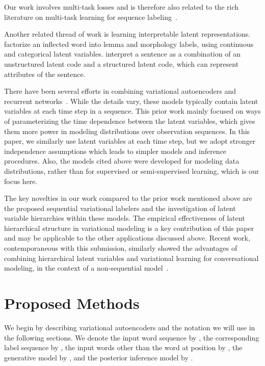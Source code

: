 \documentclass[11pt,a4paper]{article}
\newcommand{\klcomment}[1]{\textcolor{magenta}{\bf \small [ #1 --KL]}}
\renewcommand{\klcomment}[1]{}
\begin{document}
Our work involves multi-task losses and is therefore also related to the rich literature on
multi-task learning for sequence labeling~\cite[\emph{inter alia}]{plank2016multilingual,augenstein2017multi,bingel2017identifying,rei2017semi}.

Another related thread of work is learning interpretable latent representations. \citet{zhou2017multi} factorize an inflected word into lemma and morphology labels, using continuous and categorical latent variables. \citet{hu2017toward} interpret a sentence as a combination of an unstructured latent code and a structured latent code, which can represent attributes of the sentence.


There have been several efforts in combining variational autoencoders and recurrent networks~\cite{gregor2015draw,chung2015recurrent,fraccaro2016sequential}. While the details vary, these models typically contain latent variables at each time step in a sequence. This prior work mainly focused on ways of parameterizing the time dependence between the latent variables, which gives them more power in modeling distributions over observation sequences. In this paper, we similarly use latent variables at each time step, but we adopt stronger independence assumptions which leads to simpler models and inference procedures. Also, the models cited above were developed for modeling data distributions, rather than for supervised or semi-supervised learning, which is our focus here.

\klcomment{shortened this par as it seemed to be veering away from related work a bit.  please make sure I haven't removed anything important.}
The key novelties in
our work compared to the prior work mentioned above
are the proposed sequential variational labelers and the investigation of latent variable hierarchies within these models.  The empirical effectiveness of latent hierarchical structure in variational modeling is a key contribution of this paper and may be applicable to the other applications discussed above.  Recent work, contemporaneous with this submission, similarly showed the advantages of combining hierarchical latent variables and variational learning for conversational modeling, in the context of a non-sequential model~\cite{VHCR:2018:NAACL}.
\section{Proposed Methods}

We begin by describing variational autoencoders and the notation we will use in the following sections. We denote the input word sequence by , the corresponding label sequence by , the input words other than the word at position  by , the generative model by , and the posterior inference model by .
\end{document}
